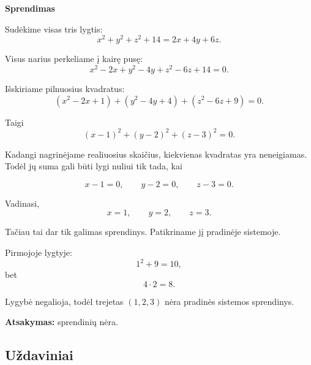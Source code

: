 \documentclass[11pt,a4paper]{scrartcl}
\newenvironment{solution}
    {\begin{list}{}{\setlength{\leftmargin}{10pt}\setlength{\rightmargin}{10pt}}\item[]}
    {\end{list}}
\begin{document}
\begin{solution}
\textbf{Sprendimas}

Sudėkime visas tris lygtis:
\[
x^2+y^2+z^2+14=2x+4y+6z.
\]

Visus narius perkeliame į kairę pusę:
\[
x^2-2x+y^2-4y+z^2-6z+14=0.
\]

Išskiriame pilnuosius kvadratus:
\[
(x^2-2x+1)
+
(y^2-4y+4)
+
(z^2-6z+9)
=0.
\]

Taigi
\[
(x-1)^2+(y-2)^2+(z-3)^2=0.
\]

Kadangi nagrinėjame realiuosius skaičius, kiekvienas kvadratas yra
neneigiamas. Todėl jų suma gali būti lygi nuliui tik tada, kai

\[
x-1=0,\qquad y-2=0,\qquad z-3=0.
\]

Vadinasi,
\[
x=1,\qquad y=2,\qquad z=3.
\]

Tačiau tai dar tik galimas sprendinys. Patikriname jį pradinėje sistemoje.

Pirmojoje lygtyje:
\[
1^2+9=10,
\]
bet
\[
4\cdot2=8.
\]

Lygybė negalioja, todėl trejetas $(1,2,3)$ nėra pradinės sistemos
sprendinys.

\textbf{Atsakymas:} sprendinių nėra.
\end{solution}

\subsection{Uždaviniai}
\end{document}
